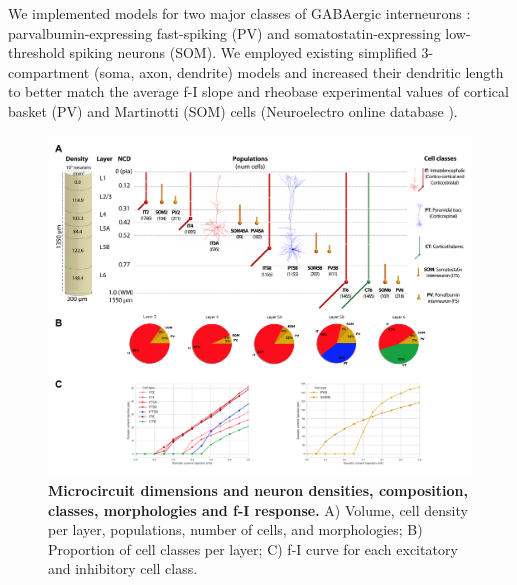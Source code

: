 We implemented models for two major classes of GABAergic interneurons \cite{Harr15}: parvalbumin-expressing fast-spiking (PV) and somatostatin-expressing low-threshold spiking neurons (SOM). We employed existing simplified 3-compartment (soma, axon, dendrite) models \cite{Kons14} and increased their dendritic length to better match the average f-I slope and rheobase experimental values of cortical basket (PV) and Martinotti (SOM) cells (Neuroelectro online database \cite{Trip15}). 


\begin{figure}[!h]  %
\centering
\includegraphics[width=\textwidth]{figs/pops.pdf}
\caption{{\bf Microcircuit dimensions and neuron densities, composition, classes, morphologies and f-I response.}
A) Volume, cell density per layer, populations, number of cells, and morphologies; B) Proportion of cell classes per layer; C) f-I curve for each excitatory and inhibitory cell class.}
\label{fig_pops}
\end{figure}

